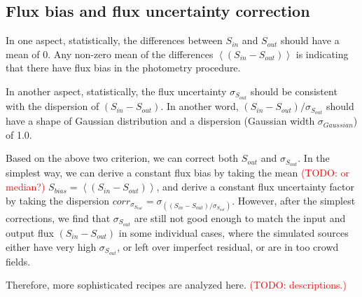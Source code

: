 \documentclass[11pt,a4paper]{article}
\begin{document}
\subsection{Flux bias and flux uncertainty correction}
\label{Band100_dfcorr}

In one aspect, statistically, the differences between $S_{in}$ and $S_{out}$ should have a mean of 0. Any non-zero mean of the differences $\left<(S_{in}-S_{out})\right>$ is indicating that there have flux bias in the photometry procedure. 

In another aspect, statistically, the flux uncertainty $\sigma_{S_{out}}$ should be consistent with the dispersion of $(S_{in}-S_{out})$. In another word, $(S_{in}-S_{out})/\sigma_{S_{out}}$ should have a shape of Gaussian distribution and a dispersion (Gaussian width $\sigma_{Gaussian}$) of 1.0. 

Based on the above two criterion, we can correct both $S_{out}$ and $\sigma_{S_{out}}$. In the simplest way, we can derive a constant flux bias by taking the mean \textcolor{red}{(TODO: or median?)} $S_{bias}=\left<(S_{in}-S_{out})\right>$, and derive a constant flux uncertainty factor by taking the dispersion ${corr}_{\sigma_{S_{out}}}=\sigma_{\left((S_{in}-S_{out})/\sigma_{S_{out}}\right)}$. However, after the simplest corrections, we find that $\sigma_{S_{out}}$ are still not good enough to match the input and output flux $(S_{in}-S_{out})$ in some individual cases, where the simulated sources either have very high $\sigma_{S_{out}}$, or left over imperfect residual, or are in too crowd fields. 

Therefore, more sophisticated recipes are analyzed here. \textcolor{red}{(TODO: descriptions.)}
\end{document}
